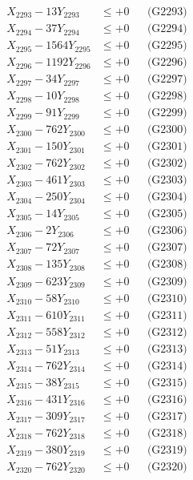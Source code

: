 \documentclass[a4paper,10pt]{article}
\begin{document}
{\begin{align}
X_{2293} - 13Y_{2293} &\leq +0 && \text{(G2293)} \\
X_{2294} - 37Y_{2294} &\leq +0 && \text{(G2294)} \\
X_{2295} - 1564Y_{2295} &\leq +0 && \text{(G2295)} \\
X_{2296} - 1192Y_{2296} &\leq +0 && \text{(G2296)} \\
X_{2297} - 34Y_{2297} &\leq +0 && \text{(G2297)} \\
X_{2298} - 10Y_{2298} &\leq +0 && \text{(G2298)} \\
X_{2299} - 91Y_{2299} &\leq +0 && \text{(G2299)} \\
X_{2300} - 762Y_{2300} &\leq +0 && \text{(G2300)} \\
\allowbreak
X_{2301} - 150Y_{2301} &\leq +0 && \text{(G2301)} \\
X_{2302} - 762Y_{2302} &\leq +0 && \text{(G2302)} \\
X_{2303} - 461Y_{2303} &\leq +0 && \text{(G2303)} \\
X_{2304} - 250Y_{2304} &\leq +0 && \text{(G2304)} \\
X_{2305} - 14Y_{2305} &\leq +0 && \text{(G2305)} \\
X_{2306} - 2Y_{2306} &\leq +0 && \text{(G2306)} \\
X_{2307} - 72Y_{2307} &\leq +0 && \text{(G2307)} \\
X_{2308} - 135Y_{2308} &\leq +0 && \text{(G2308)} \\
X_{2309} - 623Y_{2309} &\leq +0 && \text{(G2309)} \\
X_{2310} - 58Y_{2310} &\leq +0 && \text{(G2310)} \\
\allowbreak
X_{2311} - 610Y_{2311} &\leq +0 && \text{(G2311)} \\
X_{2312} - 558Y_{2312} &\leq +0 && \text{(G2312)} \\
X_{2313} - 51Y_{2313} &\leq +0 && \text{(G2313)} \\
X_{2314} - 762Y_{2314} &\leq +0 && \text{(G2314)} \\
X_{2315} - 38Y_{2315} &\leq +0 && \text{(G2315)} \\
X_{2316} - 431Y_{2316} &\leq +0 && \text{(G2316)} \\
X_{2317} - 309Y_{2317} &\leq +0 && \text{(G2317)} \\
X_{2318} - 762Y_{2318} &\leq +0 && \text{(G2318)} \\
X_{2319} - 380Y_{2319} &\leq +0 && \text{(G2319)} \\
X_{2320} - 762Y_{2320} &\leq +0 && \text{(G2320)} \\

\end{align}}
\end{document}
